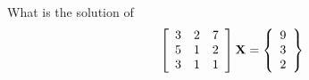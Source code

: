 \bexo

What is the solution of 
\begin{equation*}
\left[
\begin{array}{ccc}
3 & 2&7 \\
5 & 1&2\\
3&1& 1
\end{array}
\right]
\textbf{X}=
\left\{
\begin{array}{c}
9 \\
3\\
2
\end{array}
\right\}
\end{equation*}
\eexo{}

%






